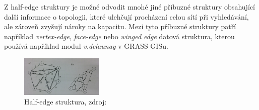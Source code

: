 \documentclass[12pt,a4paper]{article}
\begin{document}
Z half-edge struktury je možné odvodit mnohé jiné příbuzné struktury obsahující další informace o topologii, které ulehčují procházení celou sítí při vyhledávání, ale zároveň zvyšují nároky na kapacitu. Mezi tyto příbuzné struktury patří například \emph{vertex-edge}, \emph{face-edge} nebo \emph{winged edge} datová struktura, kterou používá například modul \emph{v.delaunay} v GRASS GISu.

\newpage
\begin{figure}[h!]
\centering
\includegraphics[width=0.35\textwidth, angle=90]{img/half_edge.jpg}
\caption{Half-edge struktura, zdroj: \cite{triangulation}}
\label{fig:half_edge_scan}
\end{figure}
\end{document}
